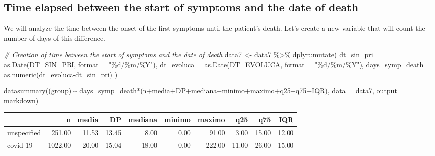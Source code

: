\documentclass[
]{article}
\newenvironment{Shaded}{\begin{snugshade}}{\end{snugshade}}
\newcommand{\AttributeTok}[1]{\textcolor[rgb]{0.77,0.63,0.00}{#1}}
\newcommand{\CommentTok}[1]{\textcolor[rgb]{0.56,0.35,0.01}{\textit{#1}}}
\newcommand{\FunctionTok}[1]{\textcolor[rgb]{0.00,0.00,0.00}{#1}}
\newcommand{\NormalTok}[1]{#1}
\newcommand{\OtherTok}[1]{\textcolor[rgb]{0.56,0.35,0.01}{#1}}
\newcommand{\SpecialCharTok}[1]{\textcolor[rgb]{0.00,0.00,0.00}{#1}}
\newcommand{\StringTok}[1]{\textcolor[rgb]{0.31,0.60,0.02}{#1}}
\begin{document}
\hypertarget{time-elapsed-between-the-start-of-symptoms-and-the-date-of-death}{%
\subsection{Time elapsed between the start of symptoms and the date of
death}\label{time-elapsed-between-the-start-of-symptoms-and-the-date-of-death}}

We will analyze the time between the onset of the first symptoms until
the patient's death. Let's create a new variable that will count the
number of days of this difference.

\begin{Shaded}
\begin{Highlighting}[]
\CommentTok{\# Creation of time between the start of symptoms and the date of death}
\NormalTok{data7 }\OtherTok{\textless{}{-}}\NormalTok{ data7 }\SpecialCharTok{\%\textgreater{}\%}
\NormalTok{   dplyr}\SpecialCharTok{::}\FunctionTok{mutate}\NormalTok{(}
    \AttributeTok{dt\_sin\_pri =} \FunctionTok{as.Date}\NormalTok{(DT\_SIN\_PRI, }\AttributeTok{format =} \StringTok{"\%d/\%m/\%Y"}\NormalTok{),}
    \AttributeTok{dt\_evoluca =} \FunctionTok{as.Date}\NormalTok{(DT\_EVOLUCA, }\AttributeTok{format =} \StringTok{"\%d/\%m/\%Y"}\NormalTok{),}
    \AttributeTok{days\_symp\_death =} \FunctionTok{as.numeric}\NormalTok{(dt\_evoluca}\SpecialCharTok{{-}}\NormalTok{dt\_sin\_pri)}
\NormalTok{)}
\end{Highlighting}
\end{Shaded}

\begin{Shaded}
\begin{Highlighting}[]
\FunctionTok{datasummary}\NormalTok{((group) }\SpecialCharTok{\textasciitilde{}}\NormalTok{ days\_symp\_death}\SpecialCharTok{*}\NormalTok{(n}\SpecialCharTok{+}\NormalTok{media}\SpecialCharTok{+}\NormalTok{DP}\SpecialCharTok{+}\NormalTok{mediana}\SpecialCharTok{+}\NormalTok{minimo}\SpecialCharTok{+}\NormalTok{maximo}\SpecialCharTok{+}\NormalTok{q25}\SpecialCharTok{+}\NormalTok{q75}\SpecialCharTok{+}\NormalTok{IQR),}
            \AttributeTok{data =}\NormalTok{ data7, }\AttributeTok{output =} \StringTok{\textquotesingle{}markdown\textquotesingle{}}\NormalTok{)}
\end{Highlighting}
\end{Shaded}

\begin{longtable}[]{@{}lrrrrrrrrr@{}}
\toprule
& n & media & DP & mediana & minimo & maximo & q25 & q75 & IQR \\
\midrule
\endhead
unspecified & 251.00 & 11.53 & 13.45 & 8.00 & 0.00 & 91.00 & 3.00 &
15.00 & 12.00 \\
covid-19 & 1022.00 & 20.00 & 15.04 & 18.00 & 0.00 & 222.00 & 11.00 &
26.00 & 15.00 \\
\bottomrule
\end{longtable}
\end{document}
